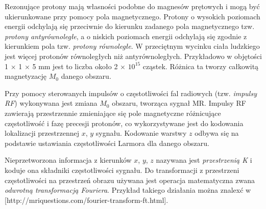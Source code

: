 Rezonujące protony mają własności podobne do magnesów prętowych i mogą być ukierunkowane przy pomocy pola magnetycznego. Protony o wysokich poziomach energii odchylają się przeciwnie do kierunku zadanego pola magnetycznego tzw. \textit{protony antyrównoległe}, a o niskich poziomach energii odchylają się zgodnie z kierunkiem pola tzw. \textit{protony równoległe}. W przeciętnym wycinku ciała ludzkiego jest więcej protonów równoległych niż antyrównoległych. Przykładowo w objętości 1 $\times$ 1 $\times$ 5 mm jest to liczba około 2 $\times$ $10^15$ cząstek. Różnica ta tworzy całkowitą magnetyzację $M_0$ danego obszaru.

Przy pomocy sterowanych impulsów o częstotliwości fal radiowych (tzw. \textit{impulsy RF}) wykonywana jest zmiana $M_0$ obszaru, tworząca sygnał MR. Impulsy RF zawierają przestrzennie zmieniające się pole magnetyczne różnicujące częstotliwość i fazę precesji protonów, co wykorzystywane jest do kodowania lokalizacji przestrzennej $x$, $y$ sygnału. Kodowanie warstwy $z$ odbywa się na podstawie ustawiania częstotliwości Larmora dla danego obszaru.

Nieprzetworzona informacja z kierunków $x$, $y$, $z$ nazywana jest \textit{przestrzenią K} i koduje ona składniki częstotliwości sygnału. Do transformacji z przestrzeni częstotliwości na przestrzeń obrazu używana jest operacja matematyczna zwana \textit{odwrotną transformacją Fouriera}. Przykład takiego działania można znalexć w [http://mriquestions.com/fourier-transform-ft.html].

